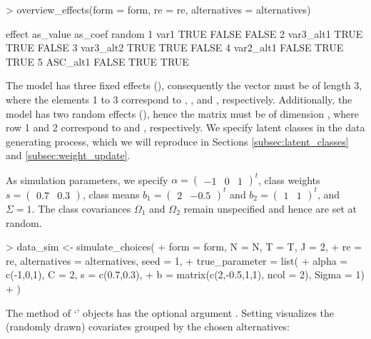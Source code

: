 \documentclass[article,shortnames]{jss}
\newcommand{\class}[1]{`\code{#1}'}
\newcommand{\fct}[1]{\code{#1()}}
\begin{document}
\begin{Schunk}
\begin{Sinput}
> overview_effects(form = form, re = re, alternatives = alternatives)
\end{Sinput}
\begin{Soutput}
     effect as_value as_coef random
1      var1     TRUE   FALSE  FALSE
2 var3_alt1     TRUE    TRUE  FALSE
3 var3_alt2     TRUE    TRUE  FALSE
4 var2_alt1    FALSE    TRUE   TRUE
5  ASC_alt1    FALSE    TRUE   TRUE
\end{Soutput}
\end{Schunk}

The model has three fixed effects (), consequently the vector  must be of length 3, where the elements 1 to 3 correspond to , , and , respectively. Additionally, the model has two random effects (), hence the matrix  must be of dimension , where row 1 and 2 correspond to  and , respectively. We specify  latent classes in the data generating process, which we will reproduce in Sections \ref{subsec:latent_classes} and \ref{subsec:weight_update}.

As simulation parameters, we specify $\alpha = \begin{pmatrix} -1 & 0 & 1 \end{pmatrix}^t$, class weights $s = \begin{pmatrix} 0.7 & 0.3 \end{pmatrix}$, class means $b_1 = \begin{pmatrix} 2 & -0.5 \end{pmatrix}^t$ and $b_2 = \begin{pmatrix} 1 & 1 \end{pmatrix}^t$, and $\Sigma = 1$. The class covariances $\Omega_1$ and $\Omega_2$ remain unspecified and hence are set at random.

\begin{Schunk}
\begin{Sinput}
> data_sim <- simulate_choices(
+    form = form, N = N, T = T, J = 2,
+    re = re, alternatives = alternatives, seed = 1,
+    true_parameter = list(
+      alpha = c(-1,0,1), C = 2, s = c(0.7,0.3),
+      b = matrix(c(2,-0.5,1,1), ncol = 2), Sigma = 1)
+  )
\end{Sinput}
\end{Schunk}

The \fct{plot} method of \class{RprobitB\_data} objects has the optional argument . Setting  visualizes the (randomly drawn) covariates grouped by the chosen alternatives:
\end{document}
